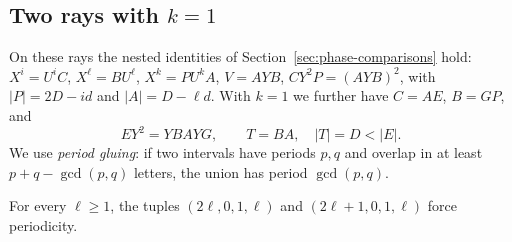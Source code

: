 \subsection{Two rays with \(k=1\)}
On these rays the nested identities of Section~\ref{sec:phase-comparisons} hold: \(X^i=U^iC\), \(X^\ell=BU^\ell\), \(X^k=PU^kA\), \(V=AYB\), \(CY^2P=(AYB)^2\), with \(|P|=2D-id\) and \(|A|=D-\ell d\). With \(k=1\) we further have \(C=AE\), \(B=GP\), and
\begin{equation}\label{eq:rays}
EY^2=YBAYG,\qquad T=BA,\quad |T|=D<|E|.
\end{equation}
We use \emph{period gluing}: if two intervals have periods \(p,q\) and overlap in at least \(p+q-\gcd(p,q)\) letters, the union has period \(\gcd(p,q)\).

\begin{theorem}\label{kone}
For every \(\ell\ge1\), the tuples \((2\ell,0,1,\ell)\) and \((2\ell+1,0,1,\ell)\) force periodicity.
\end{theorem}
